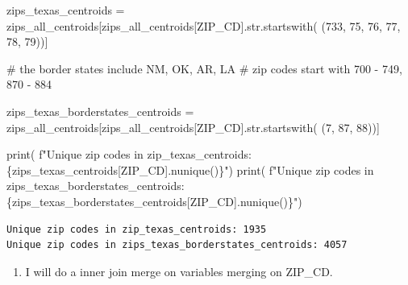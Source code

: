 \documentclass[
  letterpaper,
  DIV=11,
  numbers=noendperiod]{scrartcl}
\newenvironment{Shaded}{\begin{snugshade}}{\end{snugshade}}
\newcommand{\BuiltInTok}[1]{\textcolor[rgb]{0.00,0.23,0.31}{#1}}
\newcommand{\CommentTok}[1]{\textcolor[rgb]{0.37,0.37,0.37}{#1}}
\newcommand{\NormalTok}[1]{\textcolor[rgb]{0.00,0.23,0.31}{#1}}
\newcommand{\OperatorTok}[1]{\textcolor[rgb]{0.37,0.37,0.37}{#1}}
\newcommand{\SpecialCharTok}[1]{\textcolor[rgb]{0.37,0.37,0.37}{#1}}
\newcommand{\SpecialStringTok}[1]{\textcolor[rgb]{0.13,0.47,0.30}{#1}}
\newcommand{\StringTok}[1]{\textcolor[rgb]{0.13,0.47,0.30}{#1}}
\providecommand{\tightlist}{%
  \setlength{\itemsep}{0pt}\setlength{\parskip}{0pt}}\usepackage{longtable,booktabs,array}
\begin{document}
\begin{Shaded}
\begin{Highlighting}[]
\NormalTok{zips\_texas\_centroids }\OperatorTok{=}\NormalTok{ zips\_all\_centroids[zips\_all\_centroids[}\StringTok{\textquotesingle{}ZIP\_CD\textquotesingle{}}\NormalTok{].}\BuiltInTok{str}\NormalTok{.startswith(}
\NormalTok{    (}\StringTok{\textquotesingle{}733\textquotesingle{}}\NormalTok{, }\StringTok{\textquotesingle{}75\textquotesingle{}}\NormalTok{, }\StringTok{\textquotesingle{}76\textquotesingle{}}\NormalTok{, }\StringTok{\textquotesingle{}77\textquotesingle{}}\NormalTok{, }\StringTok{\textquotesingle{}78\textquotesingle{}}\NormalTok{, }\StringTok{\textquotesingle{}79\textquotesingle{}}\NormalTok{))]}

\CommentTok{\# the border states include NM, OK, AR, LA}
\CommentTok{\# zip codes start with 700 {-} 749, 870 {-} 884}

\NormalTok{zips\_texas\_borderstates\_centroids }\OperatorTok{=}\NormalTok{ zips\_all\_centroids[zips\_all\_centroids[}\StringTok{\textquotesingle{}ZIP\_CD\textquotesingle{}}\NormalTok{].}\BuiltInTok{str}\NormalTok{.startswith(}
\NormalTok{    (}\StringTok{\textquotesingle{}7\textquotesingle{}}\NormalTok{, }\StringTok{\textquotesingle{}87\textquotesingle{}}\NormalTok{, }\StringTok{\textquotesingle{}88\textquotesingle{}}\NormalTok{))]}

\BuiltInTok{print}\NormalTok{(}
    \SpecialStringTok{f"Unique zip codes in zip\_texas\_centroids: }\SpecialCharTok{\{}\NormalTok{zips\_texas\_centroids[}\StringTok{\textquotesingle{}ZIP\_CD\textquotesingle{}}\NormalTok{]}\SpecialCharTok{.}\NormalTok{nunique()}\SpecialCharTok{\}}\SpecialStringTok{"}\NormalTok{)}
\BuiltInTok{print}\NormalTok{(}
    \SpecialStringTok{f"Unique zip codes in zips\_texas\_borderstates\_centroids: }\SpecialCharTok{\{}\NormalTok{zips\_texas\_borderstates\_centroids[}\StringTok{\textquotesingle{}ZIP\_CD\textquotesingle{}}\NormalTok{]}\SpecialCharTok{.}\NormalTok{nunique()}\SpecialCharTok{\}}\SpecialStringTok{"}\NormalTok{)}
\end{Highlighting}
\end{Shaded}

\begin{verbatim}
Unique zip codes in zip_texas_centroids: 1935
Unique zip codes in zips_texas_borderstates_centroids: 4057
\end{verbatim}

\begin{enumerate}
\def\labelenumi{\arabic{enumi}.}
\setcounter{enumi}{2}
\tightlist
\item
  I will do a inner join merge on variables merging on ZIP\_CD.
\end{enumerate}
\end{document}
